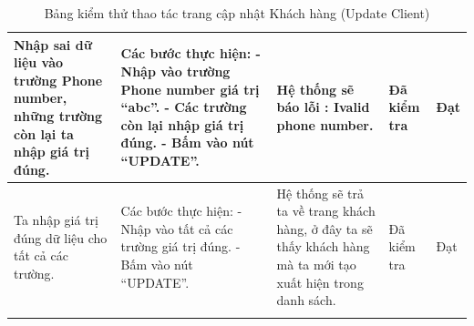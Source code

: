 \documentclass[a4paper]{article}
\begin{document}
\begin{longtable}{ | p{} |p{} | p{}  | p{}  | p{}  | }
\hline
Nhập sai dữ liệu vào trường Phone number, những trường còn lại ta nhập giá trị đúng. &
Các bước thực hiện: \newline
- Nhập vào trường Phone number giá trị  “abc”.  \newline
- Các trường còn lại nhập giá trị đúng. \newline
- Bấm vào nút “UPDATE”.
&
Hệ thống sẽ báo lỗi :  Ivalid phone number.
&
Đã kiểm tra &
Đạt \\

\hline
Ta nhập giá trị đúng dữ liệu cho tất cả các trường. &
Các bước thực hiện: \newline
- Nhập vào tất cả các trường giá trị đúng.  \newline
- Bấm vào nút “UPDATE”.
&
Hệ thống sẽ trả ta về trang khách hàng, ở đây ta sẽ thấy khách hàng mà ta mới tạo xuất hiện trong danh sách.
&
Đã kiểm tra &
Đạt \\

\hline
\caption{Bảng kiểm thử thao tác trang cập nhật Khách hàng (Update Client)}
\end{longtable}

\end{document}
